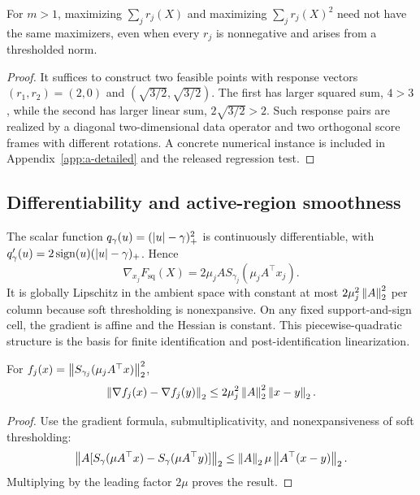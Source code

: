 \begin{proposition}
\label{prop:a-non-equivalence}
For $m>1$, maximizing $\sum_j r_j(X)$ and maximizing $\sum_j r_j(X)^2$ need not have the same maximizers, even when every $r_j$ is nonnegative and arises from a thresholded norm.
\end{proposition}
\begin{proof}
It suffices to construct two feasible points with response vectors $(r_1,r_2)=(2,0)$ and $(\sqrt{3/2},\sqrt{3/2})$. The first has larger squared sum, $4>3$, while the second has larger linear sum, $2\sqrt{3/2}>2$. Such response pairs are realized by a diagonal two-dimensional data operator and two orthogonal score frames with different rotations. A concrete numerical instance is included in Appendix~\ref{app:a-detailed} and the released regression test.
\end{proof}

\subsection{Differentiability and active-region smoothness}
The scalar function $q_\gamma(u)=(\left\lvert u \right\rvert-\gamma)_+^2$ is continuously differentiable, with
$q_\gamma'(u)=2\operatorname{sign}(u)(\left\lvert u \right\rvert-\gamma)_+$. Hence
\[
\nabla_{x_j}F_{\mathrm{sq}}(X)=2\mu_j A S_{\gamma_j}(\mu_j A^\top x_j).
\]
It is globally Lipschitz in the ambient space with constant at most $2\mu_j^2\left\lVert A \right\rVert_2^2$ per column because soft thresholding is nonexpansive. On any fixed support-and-sign cell, the gradient is affine and the Hessian is constant. This piecewise-quadratic structure is the basis for finite identification and post-identification linearization.

\begin{lemma}
\label{lem:a-lipschitz-gradient}
For $f_j(x)=\left\lVert S_{\gamma_j}(\mu_j A^\top x) \right\rVert_2^2$,
\[
\left\lVert \nabla f_j(x)-\nabla f_j(y) \right\rVert_2
\le 2\mu_j^2\left\lVert A \right\rVert_2^2\left\lVert x-y \right\rVert_2.
\]
\end{lemma}
\begin{proof}
Use the gradient formula, submultiplicativity, and nonexpansiveness of soft thresholding:
\[
\left\lVert A[S_\gamma(\mu A^\top x)-S_\gamma(\mu A^\top y)] \right\rVert_2
\le \left\lVert A \right\rVert_2\mu\left\lVert A^\top(x-y) \right\rVert_2.
\]
Multiplying by the leading factor $2\mu$ proves the result.
\end{proof}

